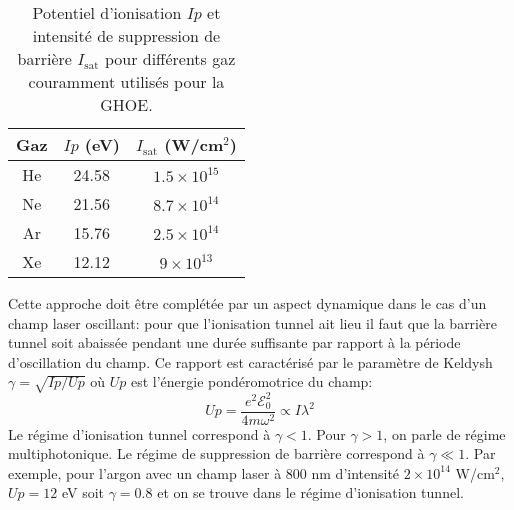 \begin{table}
\begin{center}
\begin{tabular}{|c|c|c|}
\hline
Gaz & $Ip$ (eV) & $I_\text{sat}$ (W/cm$^2$) \\
\hline
He & 24.58 & $1.5 \times 10^{15}$ \\
\hline
Ne & 21.56 & $8.7 \times 10^{14}$ \\
\hline
Ar & 15.76 & $2.5 \times 10^{14}$ \\
\hline
Xe & 12.12 & $9 \times 10^{13}$ \\
\hline
\end{tabular}
\end{center}
\caption{Potentiel d'ionisation $Ip$ et intensité de suppression de barrière $I_\text{sat}$ pour différents gaz couramment utilisés pour la GHOE.}
\label{tab:Isat}
\end{table}

Cette approche doit être complétée par un aspect dynamique dans le cas d'un champ laser oscillant: pour que l'ionisation tunnel ait lieu il faut que la barrière tunnel soit abaissée pendant une durée suffisante par rapport à la période d'oscillation du champ. Ce rapport est caractérisé par le paramètre de Keldysh  $\gamma = \sqrt{Ip/Up}$ où $Up$ est l'énergie pondéromotrice du champ:
\begin{equation}
Up = \frac{e^2 \mathcal{E}_0^2}{4 m \omega^2} \propto I \lambda^2
\label{eq:Up}
\end{equation}
Le régime d'ionisation tunnel correspond à $\gamma < 1$. Pour $\gamma > 1$, on parle de régime multiphotonique. Le régime de suppression de barrière correspond à $\gamma \ll 1$. Par exemple, pour l'argon avec un champ laser à 800 nm d'intensité $2 \times 10^{14}$ W/cm$^2$, $Up = 12$ eV soit $\gamma = 0.8$ et on se trouve dans le régime d'ionisation tunnel.

